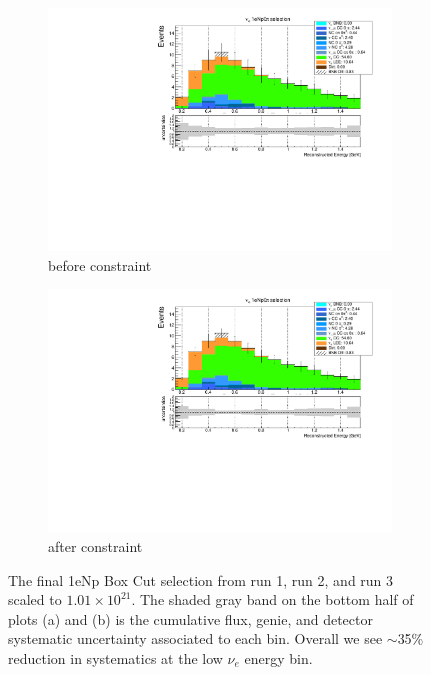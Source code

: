 \documentclass[a4paper]{article}
\begin{document}
\begin{figure}[ht] 
\begin{center}
    \begin{subfigure}[b]{0.45\textwidth}
    \centering
    \includegraphics[width=1.00\textwidth]{Sensitivity/nue1e0pnumu_constraint/nue_1e0p_numu_reco_e_H0_newboxcut_noCCMEC_withdetsys_withpoiserror_before_constraint.pdf}
    \caption{before constraint}
    \end{subfigure}
    \begin{subfigure}[b]{0.45\textwidth}
    \centering
    \includegraphics[width=1.00\textwidth]{Sensitivity/nue1e0pnumu_constraint/nue_1e0p_numu_reco_e_H0_newboxcut_noCCMEC_withdetsys_withpoiserr_after_constraint.pdf}
    \caption{after constraint}
    \end{subfigure}
\caption{\label{fig:numuconstraintresult} The final 1eNp Box Cut selection from run 1, run 2, and run 3 scaled to $1.01 \times 10^{21}$. The shaded gray band on the bottom half of plots (a) and (b) is the cumulative flux, genie, and detector systematic uncertainty associated to each bin. Overall we see $\sim$35\% reduction in systematics at the low $\nu_e$ energy bin.}
\end{center}
\end{figure}
\end{document}
